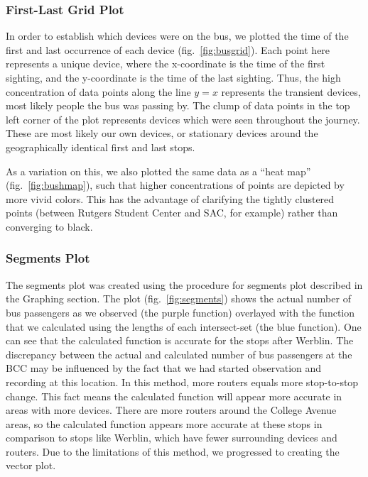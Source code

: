 \subsubsection*{First-Last Grid Plot}

In order to establish which devices were on the bus, we plotted the time of the first and last occurrence of each device (fig.~\ref{fig:busgrid}).
Each point here represents a unique device, where the x-coordinate is the time of the first sighting, and the y-coordinate is the time of the last sighting.
Thus, the high concentration of data points along the line \(y=x\) represents the transient devices, most likely people the bus was passing by.
The clump of data points in the top left corner of the plot represents devices which were seen throughout the journey.
These are most likely our own devices, or stationary devices around the geographically identical first and last stops.

As a variation on this, we also plotted the same data as a ``heat map'' (fig.~\ref{fig:bushmap}), such that higher concentrations of points are depicted by more vivid colors.
This has the advantage of clarifying the tightly clustered points (between Rutgers Student Center and SAC, for example) rather than converging to black.

\subsubsection*{Segments Plot}
The segments plot was created using the procedure for segments plot described in the Graphing section.
The plot (fig.~\ref{fig:segments}) shows the actual number of bus passengers as we observed (the purple function) overlayed with the function that we calculated using the lengths of each intersect-set (the blue function).
One can see that the calculated function is accurate for the stops after Werblin.
The discrepancy between the actual and calculated number of bus passengers at the BCC may be influenced by the fact that we had started observation and recording at this location. In this method, more routers equals more stop-to-stop change.
This fact means the calculated function will appear more accurate in areas with more devices.
There are more routers around the College Avenue areas, so the calculated function appears more accurate at these stops in comparison to stops like Werblin, which have fewer surrounding devices and routers.
Due to the limitations of this method, we progressed to creating the vector plot.

